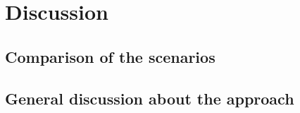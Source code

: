     \begin{figure}[h]
           \centering
        \def\svgwidth{0.85\textwidth}
        
        \caption{}
         \label{fig:HP_grid}
    \end{figure}
\section{Discussion}
\label{sec:discussion}

\subsection{Comparison of the scenarios}
\label{subsec:Comparison fo the scenarios}

\subsection{General discussion about the approach}
\label{subsec:General discussion about the approach}

%
